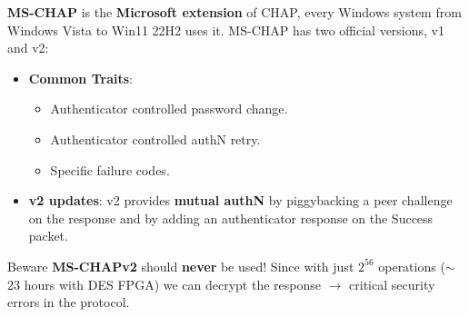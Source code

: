 \begin{customquote}
\vspace{-0.0cm}

\textbf{MS-CHAP} is the \textbf{Microsoft extension} of CHAP, every Windows system from Windows Vista to Win11 22H2 uses it. MS-CHAP has two official versions, v1 and v2:
\begin{itemize}
    \item \textbf{Common Traits}:
    \begin{itemize}
        \item Authenticator controlled password change.
        \item Authenticator controlled authN retry.
        \item Specific failure codes.
    \end{itemize}
    \item \textbf{v2 updates}: v2 provides \textbf{mutual authN} by piggybacking a peer challenge on the response and by adding an authenticator response on the Success packet.
\end{itemize}
\vspace{-0.4cm}
\begin{quotebox-red}{Beware}
    \textbf{MS-CHAPv2} should \textbf{never} be used! Since with just \(2^{56}\) operations (\(\sim\) 23 hours with DES
FPGA) we can decrypt the response \(\rightarrow \) critical security errors in the protocol.

\end{quotebox-red}
\end{customquote}

